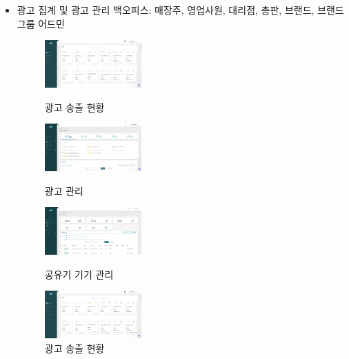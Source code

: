 \begin{itemize}
\begin{itemize}[label=$\star$]
\begin{itemize}
\begin{figure}[!ht]
			                  \end{figure}
			            \item 광고 집계 및 광고 관리 백오피스: 매장주, 영업사원, 대리점, 총판, 브랜드, 브랜드그룹 어드민
			                  \begin{figure}[!ht]
				                  \begin{fullwidth}
					                  \parbox{0.35\textwidth}{
						                  \centering
						                  \includegraphics[width=0.35\textwidth]{images/ad-fi-admin-ad-dashboard.png}
						                  \caption*{광고 송출 현황}
					                  }\qquad
					                  \parbox{0.35\textwidth}{
						                  \centering
						                  \includegraphics[width=0.35\textwidth]{images/ad-fi-admin-ad-manage.png}
						                  \caption*{광고 관리}
					                  }\qquad
					                  \parbox{0.35\textwidth}{
						                  \centering
						                  \includegraphics[width=0.35\textwidth]{images/ad-fi-admin-device-manage.png}
						                  \caption*{공유기 기기 관리}
					                  }\qquad
					                  \parbox{0.35\textwidth}{
						                  \centering
						                  \includegraphics[width=0.35\textwidth]{images/ad-fi-admin-ad-dashboard.png}
						                  \caption*{광고 송출 현황}
					                  }
					                  \parbox{0.35\textwidth}{
						                  \centering
}
\end{fullwidth}
\end{figure}
\end{itemize}
\end{itemize}
\end{itemize}
